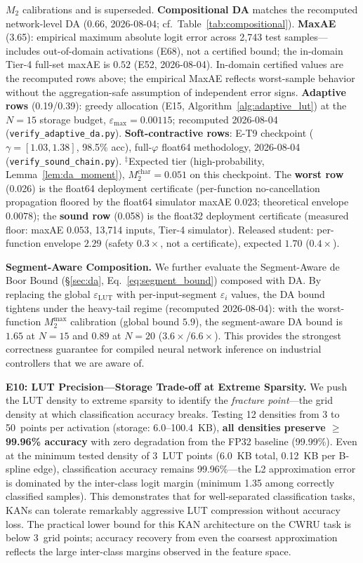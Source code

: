 \documentclass[journal,onecolumn]{IEEEtran}
\begin{document}
\begin{table}[t]
{$M_2$ calibrations and is superseded. \textbf{Compositional DA} matches
the recomputed network-level DA ($0.66$, 2026-08-04; cf.\
Table~\ref{tab:compositional}).
\textbf{MaxAE} (3.65): empirical maximum absolute logit error across
2,743 test samples---includes out-of-domain activations (E68), not a
certified bound; the in-domain Tier-4 full-set maxAE is $0.52$
(E52, 2026-08-04). In-domain certified values are the recomputed rows
above; the empirical MaxAE reflects worst-sample behavior without the
aggregation-safe assumption of independent error signs.
\textbf{Adaptive rows} (0.19/0.39): greedy allocation (E15,
Algorithm~\ref{alg:adaptive_lut}) at the $N{=}15$ storage budget,
$\varepsilon_{\max} = 0.00115$; recomputed 2026-08-04
(\texttt{verify\_adaptive\_da.py}).
\textbf{Soft-contractive rows}: E-T9 checkpoint ($\gamma =
[1.03, 1.38]$, 98.5\% acc), full-$\varphi$ float64 methodology,
2026-08-04 (\texttt{verify\_sound\_chain.py}).
$^{\ddag}$Expected tier (high-probability, Lemma~\ref{lem:da_moment}),
$M_2^{\text{char}} = 0.051$ on this checkpoint. The \textbf{worst row}
(0.026) is the float64 deployment certificate (per-function
no-cancellation propagation floored by the float64 simulator maxAE
$0.023$; theoretical envelope $0.0078$); the \textbf{sound row}
(0.058) is the float32 deployment certificate (measured floor: maxAE
$0.053$, 13{,}714 inputs, Tier-4 simulator). Released student:
per-function envelope $2.29$ (safety $0.3\times$, not a certificate),
expected $1.70$ ($0.4\times$).}
\end{table}


\textbf{Segment-Aware Composition.} We further evaluate the Segment-Aware
de Boor Bound ({\S}\ref{sec:da}, Eq.~\ref{eq:segment_bound}) composed with DA.
By replacing the global $\varepsilon_{\text{LUT}}$ with per-input-segment
$\varepsilon_i$ values, the DA bound tightens under the heavy-tail
regime (recomputed 2026-08-04): with the worst-function $M_2^{\max}$
calibration (global bound $5.9$), the segment-aware DA bound is $1.65$
at $N=15$ and $0.89$ at $N=20$ ($3.6\times$/$6.6\times$). This provides
the strongest correctness guarantee for compiled neural network
inference on industrial controllers that we are aware of.

\noindent\textbf{E10: LUT Precision---Storage Trade-off at Extreme Sparsity.}
We push the LUT density to extreme sparsity to identify the \textit{fracture
point}---the grid density at which classification accuracy breaks. Testing
12 densities from 3 to 50~points per activation (storage: 6.0--100.4~KB),
\textbf{all densities preserve $\geq$99.96\% accuracy} with zero degradation
from the FP32 baseline (99.99\%). Even at the minimum tested density of
3~LUT points (6.0~KB total, 0.12~KB per B-spline edge), classification
accuracy remains 99.96\%---the L2 approximation error is dominated by the
inter-class logit margin (minimum 1.35 among correctly classified samples).
This demonstrates that for well-separated classification tasks, KANs can
tolerate remarkably aggressive LUT compression without accuracy loss.
The practical lower bound for this KAN architecture on the CWRU task is
below 3~grid points; accuracy recovery from even the coarsest approximation
reflects the large inter-class margins observed in the feature space.
\end{document}
